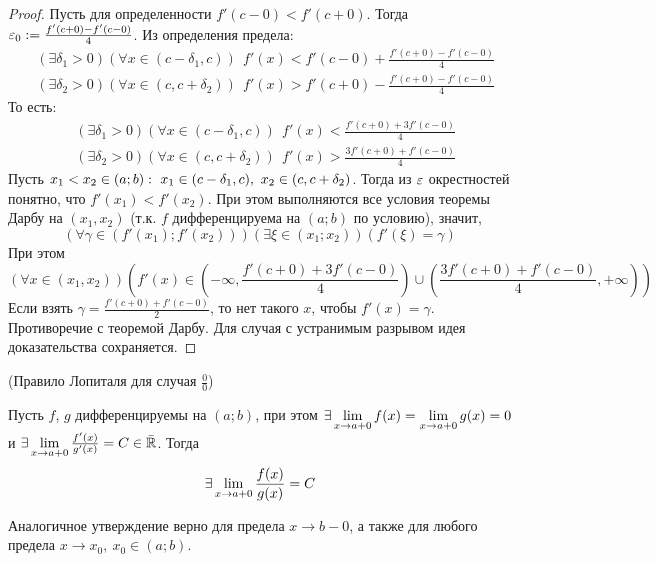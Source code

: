 \begin{proof}
	Пусть для определенности $f'(c - 0) < f'(c + 0)$. Тогда
	$\varepsilon_0 := \frac{f'(c + 0) - f'(c - 0)}{4}$. Из определения
	предела:
	\begin{align*}
		&(\exists \delta_1 > 0)(\forall x \in (c - \delta_1, c))
		\ \ f'(x) < f'(c - 0) + \frac{f'(c + 0) - f'(c - 0)}{4}\\
		&(\exists \delta_2 > 0)(\forall x \in (c, c + \delta_2))
		\ \ f'(x) > f'(c + 0) - \frac{f'(c + 0) - f'(c - 0)}{4}
	\end{align*}
	То есть:
	\begin{align*}
		&(\exists \delta_1 > 0)(\forall x \in (c - \delta_1, c))
		\ \ f'(x) < \frac{f'(c + 0) + 3f'(c - 0)}{4}\\
		&(\exists \delta_2 > 0)(\forall x \in (c, c + \delta_2))
		\ \ f'(x) > \frac{3f'(c + 0) + f'(c - 0)}{4}
	\end{align*}
	Пусть $x_1 < x_2 \in (a; b) :\  
	x_1 \in (c - \delta_1, c),\ x_2 \in (c, c + \delta_2)$. Тогда
	из $\varepsilon$ окрестностей понятно, что $f'(x_1) < f'(x_2)$.
	При этом выполняются все условия теоремы Дарбу на $(x_1, x_2)$
	(т.к. $f$ дифференцируема на $(a; b)$ по условию), значит,
	\[
		(\forall \gamma \in (f'(x_1); f'(x_2)))(\exists \xi \in (x_1; x_2))
		(f'(\xi) = \gamma)
	\]
	При этом
	\[
		(\forall x \in (x_1, x_2))\left(f'(x) \in 
		\left(-\infty, \frac{f'(c + 0) + 3f'(c - 0)}{4}\right) \cup 
		\left(\frac{3f'(c + 0) + f'(c - 0)}{4}, +\infty\right)\right)	
	\]
	Если взять $\gamma = \frac{f'(c + 0) + f'(c - 0)}{2}$, то нет такого
	$x$, чтобы $f'(x) = \gamma$. Противоречие с теоремой Дарбу.
	Для случая с устранимым разрывом идея доказательства сохраняется.
\end{proof}

\begin{theorem} (Правило Лопиталя для случая $\frac{0}{0}$)

	Пусть $f$, $g$ дифференцируемы на $(a; b)$, при этом
	$\exists \lim\limits_{x \to a+0} f(x) = \lim\limits_{x \to a+0} g(x)
	= 0$ и $\exists \lim\limits_{x \to a+0} \frac{f'(x)}{g'(x)} = C
	\in \bar{\mathbb{R}}$. Тогда
	\[
		\exists \lim\limits_{x \to a+0} \frac{f(x)}{g(x)} = C
	\]
\end{theorem}

\begin{note}
	Аналогичное утверждение верно для предела $x \to b-0$,
	а также для любого предела $x \to x_0,\ x_0 \in (a; b)$.
\end{note}

